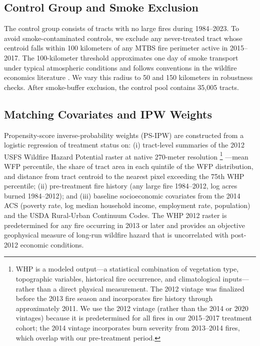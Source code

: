 \documentclass[12pt]{article}
\begin{document}
\subsection{Control Group and Smoke Exclusion}

The control group consists of tracts with no large fires
during 1984--2023.
To avoid smoke-contaminated controls, we exclude any never-treated tract
whose centroid falls within 100 kilometers of any MTBS fire perimeter
active in 2015--2017.
The 100-kilometer threshold approximates one day of smoke transport under
typical atmospheric conditions and follows conventions in the wildfire
economics literature \citep{borgschulte2024air}.
We vary this radius to 50 and 150 kilometers in robustness checks.
After smoke-buffer exclusion, the control pool contains 35,005 tracts.

\subsection{Matching Covariates and IPW Weights}

Propensity-score inverse-probability weights (PS-IPW) are constructed
from a logistic regression of treatment status on:
(i) tract-level summaries of the 2012 USFS Wildfire Hazard Potential
raster at native 270-meter resolution%
\footnote{WHP is a modeled output---a statistical combination of vegetation type,
topographic variables, historical fire occurrence, and climatological inputs---rather
than a direct physical measurement.
The 2012 vintage was finalized before the 2013 fire season and incorporates fire
history through approximately 2011.
We use the 2012 vintage (rather than the 2014 or 2020 vintages) because it is
predetermined for all fires in our 2015--2017 treatment cohort; the 2014 vintage
incorporates burn severity from 2013--2014 fires, which overlap with our
pre-treatment period.}%
---mean WFP percentile,
the share of tract area in each quintile of the WFP distribution,
and distance from tract centroid to the nearest pixel exceeding the
75th WHP percentile;
(ii) pre-treatment fire history (any large fire 1984--2012,
log acres burned 1984--2012);
and (iii) baseline socioeconomic covariates from the 2014 ACS
(poverty rate, log median household income, employment rate, population)
and the USDA Rural-Urban Continuum Codes.
The WHP 2012 raster is predetermined for any fire occurring in 2013
or later and provides an objective geophysical measure of
long-run wildfire hazard that is uncorrelated with post-2012
economic conditions.
\end{document}
